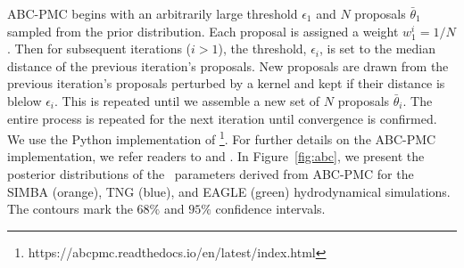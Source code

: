ABC-PMC begins with an arbitrarily large threshold $\epsilon_1$ and $N$ proposals 
$\bar{\theta}_1$ sampled from the prior distribution. Each proposal is
assigned a weight $w^i_1 = 1/N$. Then for subsequent iterations ($i > 1$), the 
threshold, $\epsilon_i$, is set to the median distance of the previous iteration's
proposals. New proposals are drawn from the previous iteration's proposals perturbed 
by a kernel and kept if their distance is blelow $\epsilon_i$. This is repeated
until we assemble a new set of $N$ proposals $\bar{\theta}_i$. The entire
process is repeated for the next iteration until convergence is confirmed. 
We use the Python implementation of
\cite{akeret2015}\footnote{https://abcpmc.readthedocs.io/en/latest/index.html}.
For further details on the ABC-PMC implementation, we refer readers to \cite{hahn2017b}
and \cite{hahn2019a}.
In Figure~\ref{fig:abc}, we present the posterior distributions of the \eda~parameters
derived from ABC-PMC for the SIMBA (orange), TNG (blue), and EAGLE (green) hydrodynamical 
simulations. The contours mark the $68\%$ and $95\%$ confidence intervals. 

